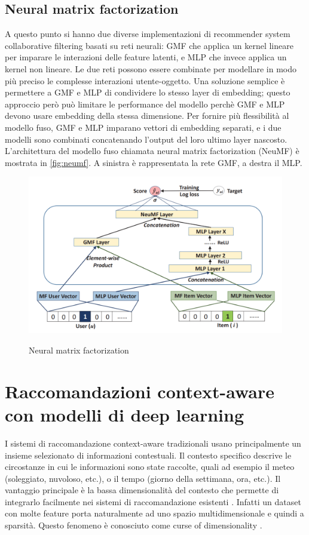 \subsection{Neural matrix factorization}
A questo punto si hanno due diverse implementazioni di recommender system collaborative filtering basati su reti neurali: GMF che applica un kernel lineare per imparare le interazioni delle feature latenti, e MLP che invece applica un kernel non lineare. Le due reti possono essere combinate per modellare in modo più preciso le complesse interazioni utente-oggetto. Una soluzione semplice è permettere a GMF e MLP di condividere lo stesso layer di embedding; questo approccio però può limitare le performance del modello perchè GMF e MLP devono usare embedding della stessa dimensione. Per fornire più flessibilità al modello fuso, GMF e MLP imparano vettori di embedding separati, e i due modelli sono combinati concatenando l'output del loro ultimo layer nascosto. L'architettura del modello fuso chiamata neural matrix factorization (NeuMF) è mostrata in \autoref{fig:neumf}. A sinistra è rappresentata la rete GMF, a destra il MLP.

\begin{figure}
  \centering
  \includegraphics[width=\linewidth]{immagini/neumf.png}
  \caption{Neural matrix factorization}
  \cite{NCF}
  \label{fig:neumf}
\end{figure}

\section{Raccomandazioni context-aware con modelli di deep learning}
I sistemi di raccomandazione context-aware tradizionali usano principalmente un insieme selezionato di informazioni contestuali. Il contesto specifico descrive le circostanze in cui le informazioni sono state raccolte, quali ad esempio il meteo (soleggiato, nuvoloso, etc.), o il tempo (giorno della settimana, ora, etc.). Il vantaggio principale è la bassa dimensionalità del contesto che permette di integrarlo facilmente nei sistemi di raccomandazione esistenti \cite{context-aware-deep-learning}. Infatti un dataset con molte feature porta naturalmente ad uno spazio multidimensionale e quindi a sparsità. Questo fenomeno è conosciuto come curse of dimensionality \cite{curse-of-dim-CARS}.

